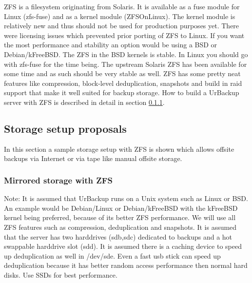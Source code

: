 \documentclass[a4paper,10pt]{article}
\begin{document}
ZFS is a filesystem originating from Solaris. It is available as a fuse module for Linux (zfs-fuse) and as a kernel module (ZFSOnLinux). The kernel module is relatively new and thus should not be used for production purposes yet. There were licensing issues which prevented prior porting of ZFS to Linux. If you want the most performance and stability an option would be using a BSD or Debian/kFreeBSD. The ZFS in the BSD kernels is stable. In Linux you should go with zfs-fuse for the time being. The upstream Solaris ZFS has been available for some time and as such should be very stable as well. ZFS has some pretty neat features like compression, block-level deduplication, snapshots and build in raid support that make it well suited for backup storage. How to build a UrBackup server with ZFS is described in detail in section \ref{subsec_ZFS_setup}.


\subsection{Storage setup proposals}
\label{sec_storage_proposals}

In this section a sample storage setup with ZFS is shown which allows offsite backups via Internet or via tape like manual offsite storage.

\subsubsection{Mirrored storage with ZFS}
\label{subsec_ZFS_setup}

Note: It is assumed that UrBackup runs on a Unix system such as Linux or BSD. An example would be Debian/Linux or Debian/kFreeBSD with the kFreeBSD kernel being preferred, because of its better ZFS performance. We will use all ZFS features such as compression, deduplication and snapshots. It is assumed that the server has two harddrives (sdb,sdc) dedicated to backups and a hot swappable harddrive slot (sdd). It is assumed there is a caching device to speed up deduplication as well in /dev/sde. Even a fast usb stick can speed up deduplication because it has better random access performance then normal hard disks. Use SSDs for best performance. 
\end{document}
